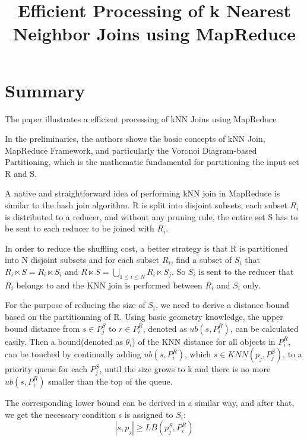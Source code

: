 \documentclass[conference]{IEEEtran}
\begin{document}
	
	\title{Efficient Processing of k Nearest Neighbor Joins using
		MapReduce}	
	\maketitle
	\IEEEpeerreviewmaketitle	
	\section{Summary}
	The paper illustrates a efficient processing of kNN Joins using MapReduce
	
	In the preliminaries, the authors shows the basic concepts of kNN Join,  MapReduce Framework, and particularly the Voronoi Diagram-based Partitioning, which is the mathematic fundamental for partitioning the input set R and S.
	
	A native and straightforward idea of performing kNN join in MapReduce is similar to the hash join algorithm. R is split into disjoint subsets, each subset $R_i$ is distributed to a reducer, and without any pruning rule, the entire set S has to be sent to each reducer to be joined with $ R_i $. 
	
	In order to reduce the shuffling cost, a better strategy is that R is partitioned into N disjoint subsets and for each subset $ R_i $, find a subset of $ S_i $ that $ R_i \ltimes S = R_i \ltimes S_i$ and $ R \ltimes S=\bigcup_{1\leq i \leq N } R_i \ltimes S_j$. So $ S_i $ is sent to the reducer that $ R_i $ belongs to and the KNN join is performed between $ R_i $ and $ S_i $ only. 
	
	For the purpose of reducing the size of $S_i$, we need to derive a distance bound based on the partitionning of R. Using basic geometry knowledge, the upper bound distance from $s\in P_j^S$ to $r\in P_i^R$, denoted as $ub(s,P_i^R)$, can be calculated easily. Then a bound(denoted as $\theta_i$) of the KNN distance for all objects in $P_i^R$, can be touched by continually adding $ub(s,P_i^R)$, which $s\in KNN(p_j,P_j^S)$, to a priority queue for each $P_j^S$, until the size grows to k and there is no more $ub(s,P_i^R)$ smaller than the top of the queue.
	
	The corresponding lower bound can be derived in a similar way, and after that, we get the necessary condition s is assigned to $S_i$:
	\begin{equation}
	|s,p_j| \geq LB(p_j^S,P_i^R)
	\end{equation}
	
\end{document}
